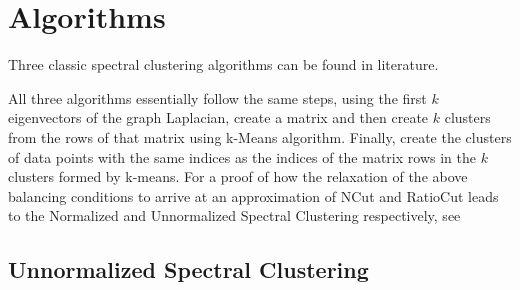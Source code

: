 \documentclass[10pt,a4paper, nocenter]{report}
\begin{document}
    \section{Algorithms}

    Three classic spectral clustering algorithms can be found in literature.

    All three algorithms essentially follow the same steps, using the first $k$ eigenvectors of the graph Laplacian, create a matrix and then create $k$ clusters from the rows of that matrix using k-Means algorithm. Finally, create the clusters of data points with the same indices as the indices of the matrix rows in the $k$ clusters formed by k-means. For a proof of how the relaxation of the above balancing conditions to arrive at an approximation of NCut and RatioCut leads to the Normalized and Unnormalized Spectral Clustering respectively, see \cite{Luxburg2007}
	
	\subsection{Unnormalized Spectral Clustering \cite{hagen-kahng-1992}}
    \begin{algorithm}
        \DontPrintSemicolon
    \end{algorithm}
\end{document}
